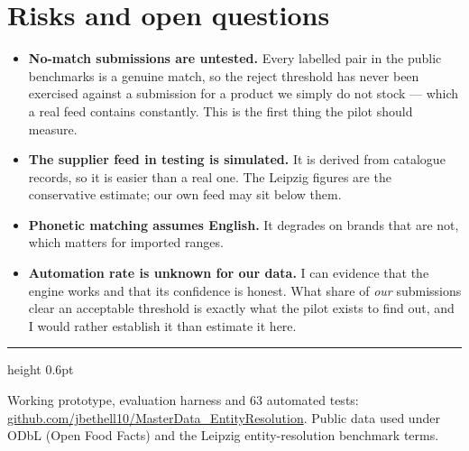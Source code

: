 \section{Risks and open questions}

\begin{itemize}
  \item \textbf{No-match submissions are untested.} Every labelled pair in the
        public benchmarks is a genuine match, so the reject threshold has never
        been exercised against a submission for a product we simply do not
        stock --- which a real feed contains constantly. This is the first thing
        the pilot should measure.
  \item \textbf{The supplier feed in testing is simulated.} It is derived from
        catalogue records, so it is easier than a real one. The Leipzig figures
        are the conservative estimate; our own feed may sit below them.
  \item \textbf{Phonetic matching assumes English.} It degrades on brands that
        are not, which matters for imported ranges.
  \item \textbf{Automation rate is unknown for our data.} I can evidence that
        the engine works and that its confidence is honest. What share of
        \emph{our} submissions clear an acceptable threshold is exactly what the
        pilot exists to find out, and I would rather establish it than estimate
        it here.
\end{itemize}

\vspace{0.6em}
{\color{rulegrey}\hrule height 0.6pt}
\vspace{0.4em}
{\small\color{black!55}
Working prototype, evaluation harness and 63 automated tests:
\href{https://github.com/jbethell10/MasterData_EntityResolution}%
{github.com/jbethell10/MasterData\_EntityResolution}.
Public data used under ODbL (Open Food Facts) and the Leipzig entity-resolution
benchmark terms.}


